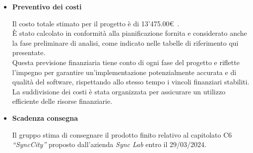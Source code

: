 \documentclass{article}
\begin{document}
\begin{itemize}
    \item[] \textbf{\fontsize{12}{6}\selectfont Preventivo dei costi} 

    Il costo totale stimato per il progetto è di 13’475.00\euro\ . \\ 
    È stato calcolato in conformità alla pianificazione fornita e considerato anche la fase preliminare di analisi, come indicato nelle tabelle di riferimento qui presentate. \\
    Questa previsione finanziaria tiene conto di ogni fase del progetto e riflette l’impegno per garantire un’implementazione potenzialmente accurata e di qualità del software, rispettando allo stesso tempo i vincoli finanziari stabiliti. La suddivisione dei costi è stata organizzata per assicurare un utilizzo efficiente delle risorse finanziarie.

    \vspace{0.5cm}

    \item[] \textbf{\fontsize{12}{6}\selectfont Scadenza consegna} 

    Il gruppo stima di consegnare il prodotto finito relativo al capitolato C6 \textit{“SyncCity”} proposto dall’azienda \textit{Sync Lab} entro il 29/03/2024.
\end{itemize}
\end{document}
